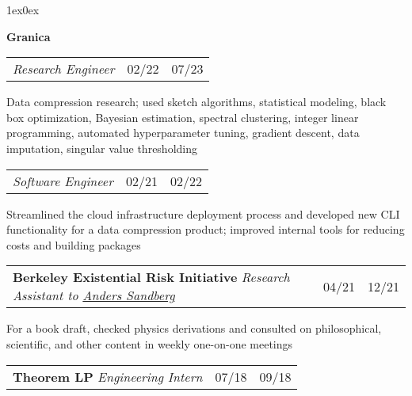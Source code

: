 \documentclass[12pt]{article}
\def\myh{20pt}
\def\indentlen{1ex}
\newcommand{\datecolor}{lavender3}
\let\oldbold\textbf
\renewcommand{\textbf}[1]{\oldbold{\color{boldpurple} #1}}
\let\olditalic\textit
\renewcommand{\textit}[1]{\olditalic{\color{lavender} #1}}
\newcommand{\mysmallerverticalspace}{\vspace{4pt}}
\newcommand{\datecolwidth}{29pt}
\newcommand{\titlecolwidth}{\textwidth - \datecolwidth*3 + \myh/2 - 5pt}
\begin{document}
{\begin{adjustwidth}{\indentlen}{0ex}
\mysmallerverticalspace

\textbf{\hspace{-\indentlen}Granica}

\color{\datecolor}

\begin{tabular}{@{}p{\titlecolwidth}r@{|}p{\datecolwidth}@{}}
\textit{Research Engineer} & 02/22 & 07/23
\end{tabular}

\color{normaltext}

Data compression research; used
sketch algorithms,
statistical modeling,
black box optimization,
Bayesian estimation,
spectral clustering,
integer linear programming,
automated hyperparameter tuning,
gradient descent,
data imputation,
singular value thresholding

\mysmallerverticalspace

\color{\datecolor}

\begin{tabular}{@{}p{\titlecolwidth}r@{|}p{\datecolwidth}@{}}
\textit{Software Engineer} & 02/21 & 02/22
\end{tabular}

\color{normaltext}

Streamlined the cloud infrastructure deployment process and developed new CLI functionality for a data compression product;
improved internal tools for reducing costs and building packages

\mysmallerverticalspace

\color{\datecolor}
\begin{tabular}{@{}p{\titlecolwidth}r@{|}p{\datecolwidth}@{}}
\textbf{\hspace{-\indentlen}Berkeley Existential Risk Initiative} \textit{Research Assistant to \href{https://www.ox.ac.uk/news-and-events/find-an-expert/dr-anders-sandberg}{Anders Sandberg}} & 04/21 & 12/21
\end{tabular}

\color{normaltext}

For a book draft, checked physics derivations and consulted on philosophical, scientific, %
and other content in weekly one-on-one meetings

\mysmallerverticalspace

\color{\datecolor}

\begin{tabular}{@{}p{\titlecolwidth}r@{|}p{\datecolwidth}@{}}
\textbf{\hspace{-\indentlen}Theorem LP} \hspace{\rolesep} \textit{Engineering Intern} & 07/18 & 09/18
\end{tabular}


\end{adjustwidth}}
\end{document}
